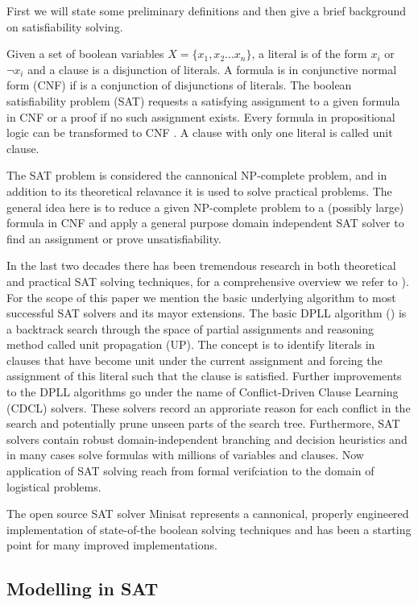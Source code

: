 \documentclass[]{llncs}
\begin{document}
First we will state some preliminary definitions and then give a brief background on satisfiability solving. 

Given a set of boolean variables $X = \{x_1, x_2 \ldots x_n\}$, a literal is of the form $x_i$ or $\neg x_i$ and a
clause is a disjunction of literals. A formula is in conjunctive normal form (CNF) if is a conjunction of disjunctions
of literals. The boolean satisfiability problem (SAT) requests a satisfying assignment to a given formula in CNF or a
proof if no such assignment exists. Every formula in propositional logic can be transformed to CNF \cite{Tseitin83}. A
clause with only one literal is called unit clause. 

The SAT problem is considered the cannonical NP-complete problem, and in addition to its theoretical relavance it is
used to solve practical problems. The general idea here is to reduce a given NP-complete problem to a (possibly large)
formula in CNF and apply a general purpose domain independent SAT solver to find an assignment or prove
unsatisfiability. 

In the last two decades there has been tremendous research in both theoretical and practical SAT solving techniques, for
a comprehensive overview we refer to \cite{Biere09}). For the scope of this paper we mention the basic underlying
algorithm to most successful SAT solvers and its mayor extensions. The basic DPLL algorithm (\cite{Putnam60}) is a
 backtrack search through the space of partial assignments and  reasoning method called unit propagation (UP). The concept is to
identify literals in clauses that have become unit under the current assignment and forcing the assignment of this
literal such that the clause is satisfied. Further improvements to the DPLL algorithms go under the name of
Conflict-Driven Clause Learning (CDCL) solvers. These solvers record an approriate reason for each conflict in the
search and potentially prune unseen parts of the search tree. Furthermore, SAT solvers contain robust domain-independent
branching and decision heuristics and in many cases solve formulas with millions of variables and clauses. Now
application of SAT solving reach from formal verifciation to the domain of logistical problems. 

The open source SAT solver Minisat \cite{Een03} represents a cannonical, properly engineered implementation of
state-of-the boolean solving techniques and has been a starting point for many improved implementations. 

\subsection{Modelling in SAT}
\end{document}
